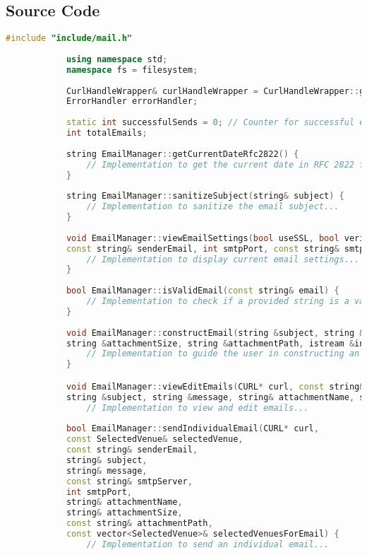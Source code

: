 \documentclass{article}
\begin{document}
	\subsection*{Source Code}
	\begin{mdframed}[backgroundcolor=background, hidealllines=false, innerleftmargin=15pt, innerrightmargin=5pt, innertopmargin=0pt, innerbottommargin=-5pt, linecolor=accent]
		\begin{lstlisting}[language=C++]
			#include "include/mail.h"
			
			using namespace std;
			namespace fs = filesystem;
			
			CurlHandleWrapper& curlHandleWrapper = CurlHandleWrapper::getInstance();
			ErrorHandler errorHandler;
			
			static int successfulSends = 0; // Counter for successful email sends
			int totalEmails;
			
			string EmailManager::getCurrentDateRfc2822() {
				// Implementation to get the current date in RFC 2822 format...
			}
			
			string EmailManager::sanitizeSubject(string& subject) {
				// Implementation to sanitize the email subject...
			}
			
			void EmailManager::viewEmailSettings(bool useSSL, bool verifyPeer, bool verifyHost, bool verbose,
			const string& senderEmail, int smtpPort, const string& smtpServer) {
				// Implementation to display current email settings...
			}
			
			bool EmailManager::isValidEmail(const string& email) {
				// Implementation to check if a provided string is a valid email format...
			}
			
			void EmailManager::constructEmail(string &subject, string &message, string &attachmentName, 
			string &attachmentSize, string &attachmentPath, istream &in) {
				// Implementation to guide the user in constructing an email...
			}

			void EmailManager::viewEditEmails(CURL* curl, const string& smtpServer, int smtpPort, const vector<SelectedVenue>& selectedVenuesForEmail, const string& senderEmail, 
			string &subject, string &message, string& attachmentName, string& attachmentSize, string& attachmentPath, bool& templateExists) {
				// Implementation to view and edit emails...
				
			bool EmailManager::sendIndividualEmail(CURL* curl,
			const SelectedVenue& selectedVenue,
			const string& senderEmail,
			string& subject,
			string& message,
			const string& smtpServer,
			int smtpPort,
			string& attachmentName,
			string& attachmentSize,
			const string& attachmentPath,
			const vector<SelectedVenue>& selectedVenuesForEmail) {
				// Implementation to send an individual email...
			

\end{lstlisting}
\end{mdframed}
\end{document}
